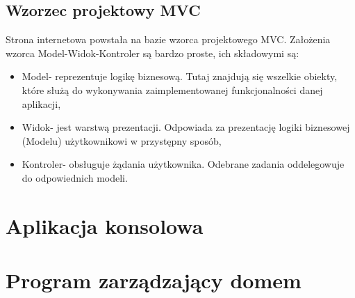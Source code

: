 \subsection{Wzorzec projektowy MVC}
Strona internetowa powstała na bazie wzorca projektowego MVC. Założenia wzorca Model-Widok-Kontroler są bardzo proste, ich składowymi są:
\begin{itemize}
\item Model- reprezentuje logikę biznesową. Tutaj znajdują się wszelkie obiekty, które służą do wykonywania zaimplementowanej funkcjonalności danej aplikacji,
\item Widok- jest warstwą prezentacji. Odpowiada za prezentację logiki biznesowej (Modelu) użytkownikowi w przystępny sposób,
\item Kontroler- obsługuje żądania użytkownika. Odebrane zadania oddelegowuje do odpowiednich modeli.
\end{itemize}

\section{Aplikacja konsolowa}
\section{Program zarządzający domem}
